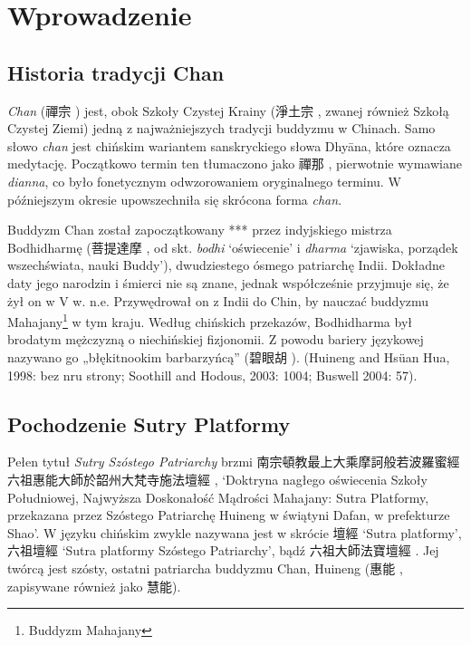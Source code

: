 \maketitle
\section{Wprowadzenie}
\subsection{Historia tradycji Chan}
\emph{Chan} (禪宗 ) jest, obok Szkoły Czystej Krainy (淨土宗 , zwanej również Szkołą Czystej Ziemi) jedną z najważniejszych tradycji buddyzmu w Chinach. Samo słowo \emph{chan} jest chińskim wariantem %
sanskryckiego słowa Dhyāna, które oznacza medytację. %
Początkowo termin ten tłumaczono jako 禪那 , pierwotnie wymawiane \emph{dianna}, co było fonetycznym odwzorowaniem oryginalnego terminu. W późniejszym okresie upowszechniła się skrócona forma \emph{chan}.

Buddyzm Chan został zapoczątkowany *** przez indyjskiego mistrza Bodhidharmę (菩提達摩 , od skt. \emph{bodhi} `oświecenie' i \emph{dharma} `zjawiska, porządek wszechświata, nauki Buddy'), dwudziestego ósmego patriarchę Indii. Dokładne daty jego narodzin i śmierci nie są znane, jednak współcześnie przyjmuje się, że żył on w V w. n.e. Przywędrował on z Indii do Chin, by nauczać buddyzmu Mahajany\footnote{Buddyzm Mahajany} w tym kraju. Według chińskich przekazów, Bodhidharma był brodatym mężczyzną o niechińskiej fizjonomii. Z powodu bariery językowej nazywano go „błękitnookim barbarzyńcą” (碧眼胡 ). (Huineng and Hsüan Hua, 1998: bez nru strony; Soothill and Hodous, 2003: 1004; Buswell 2004: 57).

\subsection{Pochodzenie Sutry Platformy}

Pełen tytuł \emph{Sutry Szóstego Patriarchy} brzmi 南宗頓教最上大乘摩訶般若波羅蜜經六祖惠能大師於韶州大梵寺施法壇經 , `Doktryna nagłego oświecenia Szkoły Południowej, Najwyższa Doskonałość Mądrości Mahajany: Sutra Platformy, przekazana przez Szóstego Patriarchę Huineng w świątyni Dafan, w prefekturze Shao'. W języku chińskim zwykle nazywana jest w skrócie 壇經  `Sutra platformy', 六祖壇經  `Sutra platformy Szóstego Patriarchy', bądź 六祖大師法寶壇經 . Jej twórcą jest szósty, ostatni patriarcha buddyzmu Chan, Huineng (惠能 , zapisywane również jako 慧能). %

